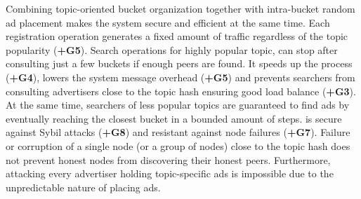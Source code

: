 
Combining topic-oriented bucket organization together with intra-bucket random ad placement makes the system secure and efficient at the same time. 
Each registration operation generates a fixed amount of traffic regardless of the topic popularity (\textbf{+G5}). 
Search operations for highly popular topic, can stop after consulting just a few buckets if enough peers are found. 
It speeds up the process (\textbf{+G4}), lowers the system message overhead (\textbf{+G5}) and prevents searchers from consulting advertisers close to the topic hash ensuring good load balance (\textbf{+G3}). 
At the same time, searchers of less popular topics are guaranteed to find ads by eventually reaching the closest bucket in a bounded amount of steps. 
\sysname is secure against Sybil attacks (\textbf{+G8}) and resistant against node failures (\textbf{+G7}). Failure or corruption of a single node (or a group of nodes) close to the topic hash does not prevent honest nodes from discovering their honest peers. 
Furthermore, attacking every advertiser holding topic-specific ads is impossible due to the unpredictable nature of placing ads. 

